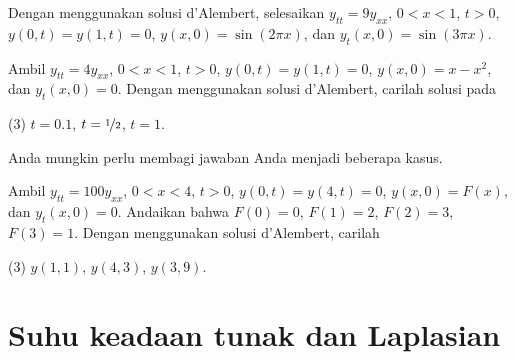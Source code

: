 \setcounter{exercise}{100}

\begin{exercise}
Dengan menggunakan solusi d'Alembert, selesaikan $y_{tt} = 9y_{xx}$, $0 < x < 1$, $t >
0$,
$y(0,t) = y(1, t) = 0$, $y(x,0) = \sin (2 \pi x)$, dan
$y_t(x,0) = \sin (3 \pi x)$.
\end{exercise}

\begin{exercise}
Ambil $y_{tt} = 4y_{xx}$, $0 < x < 1$, $t > 0$,
$y(0,t) = y(1, t) = 0$, $y(x,0) = x-x^2$, dan
$y_t(x,0) = 0$.  Dengan menggunakan solusi d'Alembert, carilah
solusi pada
\begin{tasks}(3)
\task $t=0.1$,
\task $t=\nicefrac{1}{2}$,
\task $t=1$.
\end{tasks}
Anda mungkin perlu membagi jawaban Anda menjadi beberapa kasus.
\end{exercise}

\begin{exercise}
Ambil $y_{tt} = 100y_{xx}$, $0 < x < 4$, $t > 0$,
$y(0,t) = y(4, t) = 0$, $y(x,0) = F(x)$, dan
$y_t(x,0) = 0$.  Andaikan bahwa
$F(0)=0$,
$F(1)=2$,
$F(2)=3$,
$F(3)=1$.
Dengan menggunakan solusi d'Alembert, carilah
\begin{tasks}(3)
\task $y(1,1)$,
\task $y(4,3)$,
\task $y(3,9)$.
\end{tasks}
\end{exercise}


\sectionnewpage
\section{Suhu keadaan tunak dan Laplasian}
\label{dirich:section}


